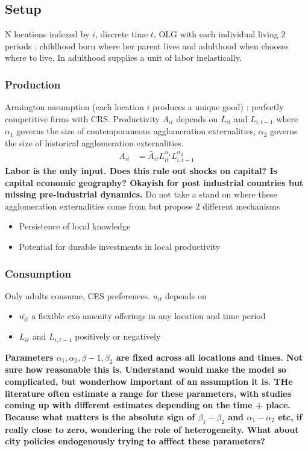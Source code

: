 \documentclass[10pt, final]{article}
\def\a{\alpha}
\begin{document}
\subsection{Setup} %
\label{sub:setup}
N locations indexed by $i$, discrete time $t$, OLG with each individual living 2 periods : childhood born where her parent lives and adulthood when chooses where to live. In adulthood supplies a unit of labor inelastically.

\subsubsection{Production} %
\label{ssub:production}

Armington assumption (each location $i$ produces a unique good) ; perfectly competitive firms with CRS.
Productivity $A_{it}$ depends on $L_{it}$ and $L_{i,t-1}$ where $\a_1$ governs the size of contemporaneous agglomeration externalities, $\a_2$ governs the size of historical agglomeration externalities.
\begin{align*}
    A_{it} &= \bar{A}_{it} L_{it}^{\alpha_1} L_{i,t-1}^{\alpha_2}
\end{align*}
\textbf{Labor is the only input. Does this rule out shocks on capital? Is capital economic geography? Okayish for post industrial countries but missing pre-industrial dynamics.}
Do not take a stand on where these agglomeration externalities come from but propose 2 different mechanisms
\begin{itemize}
    \item Persistence of local knowledge
    \item Potential for durable investments in local productivity
\end{itemize}


\subsubsection{Consumption} %
\label{ssub:consumption}

Only adults consume, CES preferences. $u_{it}$ depends on 
\begin{itemize}
    \item $\bar{u_{it}}$ a flexible exo amenity offerings in any location and time period
    \item $L_{it}$ and $L_{i,t-1}$ positively or negatively
\end{itemize}
\textbf{Parameters $\alpha_1, \alpha_2, \beta-1, \beta_2$ are fixed across all locations and times. Not sure how reasonable this is. Understand would make the model so complicated, but wonderhow important of an assumption it is. THe literature often estimate a range for these parameters, with studies coming up with different estimates depending on the time + place. Because what matters is the absolute sign of $\beta_1 - \beta_2$ and $\alpha_1 - \alpha_2$ etc, if really close to zero, wondering the role of heterogeneity. What about city policies endogenously trying to afffect these parameters?}
\end{document}
